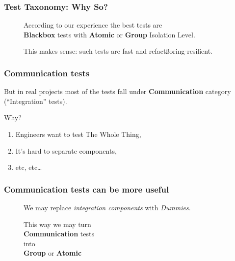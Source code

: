 \documentclass[usenames,dvipsnames,aspectratio=169]{beamer}
\begin{document}
\begin{frame}
  \frametitle{Test Taxonomy: Why So?}
  \begin{figure}
    According to our experience the best tests are \\
     \textbf{Blackbox} tests with \textbf{Atomic} or \textbf{Group} Isolation Level.
  \end{figure}
  \begin{figure}
    This makes sense: such tests are fast and refactßoring-resilient.
  \end{figure}
\end{frame}

\begin{frame}
  \frametitle{Communication tests}
  But in real projects most of the tests fall under \textbf{Communication} category  (``Integration'' tests).

  \vspace{0.3cm}
  Why?
  \begin{enumerate}
  \item Engineers want to test The Whole Thing,
  \item It's hard to separate components,
  \item etc, etc\dots
  \end{enumerate}
\end{frame}

\begin{frame}
  \frametitle{Communication tests can be more useful}

  \begin{figure}
  We may replace \textit{integration components} with \textit{Dummies}\footnotemark[1].
  \end{figure}

  \begin{figure}
  This way we may turn \\
  \textbf{Communication} tests \\
  into \\
  \textbf{Group} or \textbf{Atomic}\footnotemark[2]
  \end{figure}

\end{frame}
\end{document}

